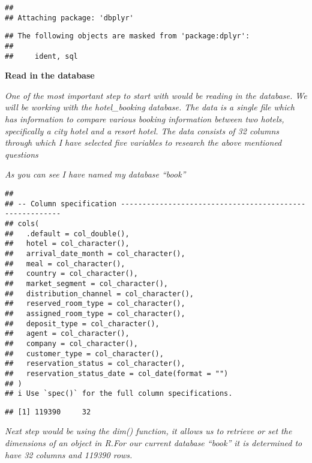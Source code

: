 \documentclass[
]{article}
\begin{document}
\begin{verbatim}
## 
## Attaching package: 'dbplyr'
\end{verbatim}

\begin{verbatim}
## The following objects are masked from 'package:dplyr':
## 
##     ident, sql
\end{verbatim}

\textbf{Read in the database}

\emph{One of the most important step to start with would be reading in
the database. We will be working with the hotel\_booking database. The
data is a single file which has information to compare various booking
information between two hotels, specifically a city hotel and a resort
hotel. The data consists of 32 columns through which I have selected
five variables to research the above mentioned questions}

\emph{As you can see I have named my database ``book''}

\begin{verbatim}
## 
## -- Column specification --------------------------------------------------------
## cols(
##   .default = col_double(),
##   hotel = col_character(),
##   arrival_date_month = col_character(),
##   meal = col_character(),
##   country = col_character(),
##   market_segment = col_character(),
##   distribution_channel = col_character(),
##   reserved_room_type = col_character(),
##   assigned_room_type = col_character(),
##   deposit_type = col_character(),
##   agent = col_character(),
##   company = col_character(),
##   customer_type = col_character(),
##   reservation_status = col_character(),
##   reservation_status_date = col_date(format = "")
## )
## i Use `spec()` for the full column specifications.
\end{verbatim}

\begin{verbatim}
## [1] 119390     32
\end{verbatim}

\emph{Next step would be using the dim() function, it allows us to
retrieve or set the dimensions of an object in R.For our current
database ``book'' it is determined to have 32 columns and 119390 rows.}
\end{document}
